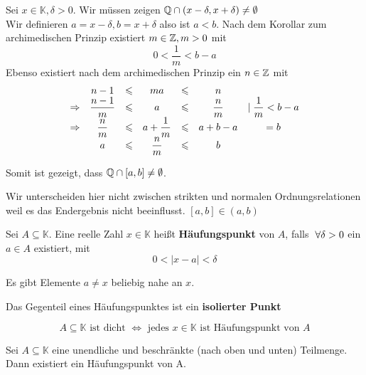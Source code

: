 \documentclass[main.tex]{subfiles}
\begin{document}
\begin{Beweis}
  Sei $x\in \mathbb{K}, \delta > 0$. Wir müssen zeigen $\Q \cap (x-\delta, x+\delta) \neq \emptyset$\\
  Wir definieren $a = x- \delta, b = x+\delta$ also ist $a < b$.
  Nach dem Korollar zum archimedischen Prinzip existiert $m \in \Z, m > 0$ mit
  $$ 0 < \dfrac{1}{m}< b-a$$
  Ebenso existiert nach dem archimedischen Prinzip ein $n\in \Z$ mit
  $$\begin{array}{c c c c c c c}
    & n-1 & \leq & ma & \leq & n &\\
    \Rightarrow & \dfrac{n-1}{m} & \leq & a & \leq & \dfrac{n}{m} & \mid \dfrac{1}{m} < b-a \\
    \Rightarrow & \dfrac{n}{m} & \leq & a + \dfrac{1}{m} & \leq & a+b-a & = b \\
    & a & \leq & \dfrac{n}{m} & \leq & b &
  \end{array}$$

  Somit ist gezeigt, dass $\Q \cap [a,b] \neq \emptyset$.
  \begin{Bemerkung}
    Wir unterscheiden hier nicht zwischen strikten und normalen Ordnungsrelationen weil es das Endergebnis nicht beeinflusst. $[a,b] \in (a,b)$
  \end{Bemerkung}
\end{Beweis}

\begin{Definition}[Häufungspunkt]
  Sei $A \subseteq \mathbb{K}$. Eine reelle Zahl $x \in \mathbb{K}$ heißt \textbf{Häufungspunkt} von $A$, falls $\A \delta > 0$ ein $a\in A$ existiert, mit
  $$0 < |x-a| < \delta$$
  \begin{Bemerkung}[informell]
    Es gibt Elemente $a \neq x$ beliebig nahe an $x$.
  \end{Bemerkung}
  Das Gegenteil eines Häufungspunktes ist ein \textbf{isolierter Punkt}
\end{Definition}

\begin{Bemerkung}
  \begin{Theorem}
    $$A \subseteq \mathbb{K} \text{ ist dicht } \Leftrightarrow \text{ jedes } x \in \mathbb{K} \text{ ist Häufungspunkt von } A$$
  \end{Theorem}
\end{Bemerkung}

\begin{Theorem}
  Sei $A \subseteq \mathbb{K}$ eine unendliche und beschränkte (nach oben und unten) Teilmenge. Dann existiert ein Häufungspunkt von A.
\end{Theorem}
\end{document}
